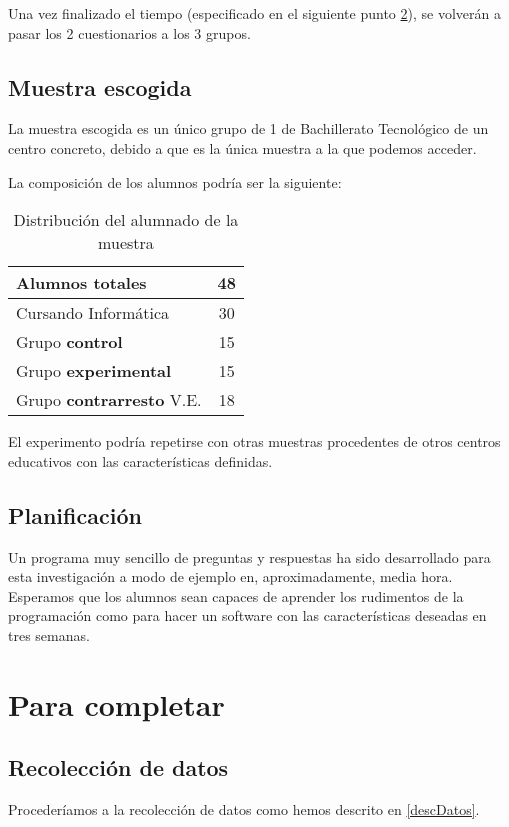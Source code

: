 \documentclass[palatino,miniheader]{apuntesURJC}
\begin{document}
Una vez finalizado el tiempo (especificado en el siguiente punto \ref{tiempos}), se volverán a pasar los 2 cuestionarios a los 3 grupos.

\section{Muestra escogida}

La muestra escogida es un único grupo de 1 de Bachillerato Tecnológico de un centro concreto, debido a que es la única muestra a la que podemos acceder.

La composición de los alumnos podría ser la siguiente:

\begin{table}[hbtp]
\centering
\begin{tabular}{|l|c|}
\hline
Alumnos \textbf{totales} & 48\\\hline
Cursando Informática & 30 \\\hline\hline
Grupo \textbf{control} & 15 \\
Grupo \textbf{experimental} & 15 \\
Grupo \textbf{contrarresto} V.E. & 18 \\\hline
\end{tabular}
\caption{Distribución del alumnado de la muestra}
\end{table}

El experimento podría repetirse con otras muestras procedentes de otros centros educativos con las características definidas.


\section{Planificación}
\label{tiempos}
Un programa muy sencillo de preguntas y respuestas ha sido desarrollado para esta investigación a modo de ejemplo en, aproximadamente, media hora.
%
Esperamos que los alumnos sean capaces de aprender los rudimentos de la programación como para hacer un software con las características deseadas en tres semanas.

\chapter{Para completar}
\section{Recolección de datos}

Procederíamos a la recolección de datos como hemos descrito en \ref{descDatos}.
\end{document}
